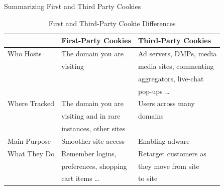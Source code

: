 \documentclass[pdf]{beamer}
\theoremstyle{remark}
\theoremstyle{definition}
\begin{document}
\begin{frame}[t]{Summarizing First and Third Party Cookies}
\small
\begin{table}[htbp]
  \centering
  \captionsetup{justification=centering}
    \begin{tabular}{|lll|}
    \toprule
   & \textbf{{\color{franklinblue} First-Party Cookies }} & \textbf{{\color{franklinblue} Third-Party Cookies}} \\
   \midrule
  {\color{franklinblue} Who Hosts} & The domain you are & Ad servers, DMPs, media  \\
  & visiting & media sites, commenting   \\
  & & aggregators, live-chat  \\
   & & pop-ups \ldots \\
     \midrule
  {\color{franklinblue} Where Tracked}  & The domain you are &  Users across many  \\
  &  visiting and in rare   & domains \\
  &  instances, other sites & \\
     \midrule
  {\color{franklinblue} Main Purpose} & Smoother site access & Enabling adware \\
     \midrule
  {\color{franklinblue} What They Do} & Remember logins,  & Retarget customers as \\
  &  preferences, shopping & they move from site \\
  &  cart items \ldots & to site \\
  \bottomrule
     \end{tabular}%
  \caption{First and Third-Party Cookie Differences}
  \label{tab:cookies}%
\end{table}%
\end{frame}
\end{document}
